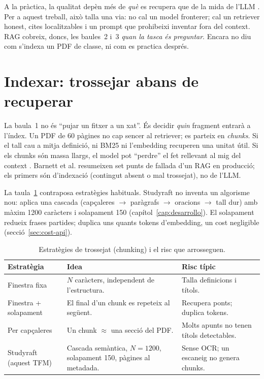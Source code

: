 A la pràctica, la qualitat depèn més de \emph{què} es recupera que de la mida de l'LLM \parencite{gao2024retrieval}. Per a aquest treball, això talla una via: no cal un model fronterer; cal un retriever honest, cites localitzables i un prompt que prohibeixi inventar fora del context. RAG cobreix, doncs, les baules~2 i~3 \emph{quan la tasca és preguntar}. Encara no diu com s'indexa un PDF de classe, ni com es practica després.

\section{Indexar: trossejar abans de recuperar}

La baula~1 no és ``pujar un fitxer a un xat''. És decidir \emph{quin} fragment entrarà a l'índex. Un PDF de 60 pàgines no cap sencer al retriever; es parteix en \emph{chunks}. Si el tall cau a mitja definició, ni BM25 ni l'embedding recuperen una unitat útil. Si els chunks són massa llargs, el model pot ``perdre'' el fet rellevant al mig del context \parencite{liu2024lost}. Barnett et al. \parencite{barnett2024seven} resumeixen set punts de fallada d'un RAG en producció; els primers són d'indexació (contingut absent o mal trossejat), no de l'LLM.

La taula~\ref{tab:chunking} contraposa estratègies habituals. Studyraft no inventa un algorisme nou: aplica una cascada (capçaleres $\rightarrow$ paràgrafs $\rightarrow$ oracions $\rightarrow$ tall dur) amb màxim 1200 caràcters i solapament 150 (capítol~\ref{cap:desarrollo}). El solapament redueix frases partides; duplica uns quants tokens d'embedding, un cost negligible (secció~\ref{sec:cost-api}).

\begin{table}[htbp]
\centering
\caption{Estratègies de trossejat (chunking) i el risc que arrosseguen.}
\label{tab:chunking}
\small
\begin{tabularx}{\textwidth}{lXX}
\toprule
Estratègia & Idea & Risc típic \\
\midrule
Finestra fixa & $N$ caràcters, independent de l'estructura. & Talla definicions i títols. \\
Finestra + solapament & El final d'un chunk es repeteix al següent. & Recupera ponts; duplica tokens. \\
Per capçaleres & Un chunk $\approx$ una secció del PDF. & Molts apunts no tenen títols detectables. \\
Studyraft (aquest TFM) & Cascada semàntica, $N{=}1200$, solapament 150, pàgines al metadada. & Sense OCR; un escaneig no genera chunks. \\
\bottomrule
\end{tabularx}
\end{table}

